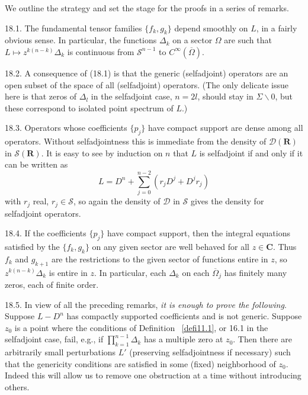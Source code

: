 \documentclass{surv-l}
\theoremstyle{plain}
\theoremstyle{definition}
\numberwithin{equation}{chapter}
\begin{document}
We outline the strategy and set the stage for the proofs in a series of remarks.

18.1.  The fundamental tensor families $\{f_{k}, g_{k}\}$ depend smoothly on $L$, in a fairly obvious sense. In particular, the functions $\Delta_{k}$ on a sector $\Omega$ are such that $L\mapsto z^{k(n-k)}\Delta_{k}$ is continuous from $\mathscr{S}^{n-1}$ to $C^{\infty}(\overline{\Omega})$.

18.2.\label{subsec18.2}  A consequence of (18.1) is that the generic (selfadjoint) operators are an open subset of the space of all (selfadjoint) operators. (The only delicate issue here is that zeros of $\Delta_{l}$ in the selfadjoint case, $n=2l$, should stay in $\Sigma\backslash 0$, but these correspond to isolated point spectrum of $L$.)

18.3.\label{subsec18.3} Operators whose coefficients  $\{p_{j}\}$  have compact support are dense among all operators. Without selfadjointness this is immediate from the density of $\mathscr{D}\mathbf{(R)}$ in $\mathscr{S}\mathbf{(R)}$. It is easy to see by induction on $n$ that $L$ is selfadjoint if and only if it can be written as
\begin{equation*}
L=D^{n}+\sum_{j=0}^{n-2}(r_{j}D^{j}+D^{j}r_{j})
\end{equation*}
with $r_{j}$ real, $r_{j}\in \mathscr{S}$, so again the density of $\mathscr{D}$ in $\mathscr{S}$ gives the density for selfadjoint operators.

18.4.\label{subsec18.4}  If the coefficients $\{p_{j}\}$ have compact support, then the integral equations satisfied by the $\{f_{k},g_{k}\}$ on any given sector are well behaved for all $ z\in \mathbf{C}$. Thus $f_{k}$ and $g_{k+1}$ are the restrictions to the given sector of functions entire in $z$, so $z^{k(n-k)}\Delta_{k}$ is entire in $z$. In particular, each $\Delta_{k}$ on each $\overline{\Omega}_{j}$ has finitely many zeros, each of finite order.

18.5.\label{subsec18.5}  In view of all the preceding remarks, \emph{it is enough to prove the following}. Suppose $L-D^{n}$ has compactly supported coefficients and is not generic. Suppose $z_{0}$ is a point where the conditions of Definition ~\ref{defi11.1}, or 16.1 in the selfadjoint case, fail, e.g., if $\prod_{k=1}^{n-1}\Delta_{k}$ has a multiple zero at $z_{0}$. Then there are arbitrarily small perturbations $L'$ (preserving selfadjointness if necessary) such that the genericity conditions are satisfied in some (fixed) neighborhood of $z_{0}$. Indeed this will allow us to remove one obstruction at a time without introducing others.
\end{document}
